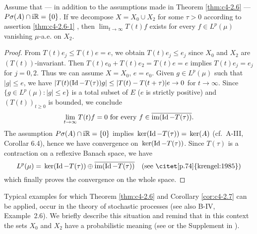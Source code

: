 \begin{corollary}\label{cor:c4-2.7}
%
%
%
Assume that --- in addition to the assumptions made in Theorem \ref{thm:c4-2.6} --- $P{\sigma}(A) \cap \mathrm{i}\mathbb{R} = \{0\}$.
If we decompose $X = X_{0} \cup X_{2}$ for some $\tau > 0$ according to assertion \ref{thm:c4-2.6-1} , then $\lim_{t \to \infty} T(t)f$ exists for every $f \in L^{p}(\mu)$ vanishing $\mu$-a.e. on $X_{2}$.
\end{corollary}
\begin{proof}
From $T(t)e_{j} \leq T(t)e = e$, we obtain $T(t)e_{j} \leq e_{j}$ since $X_{0}$ and $X_{2}$ are $(T(t))$-invariant.
Then $T(t)e_{0} + T(t)e_{2} = T(t)e = e$ implies $T(t)e_{j} = e_{j}$ for $j=0,2$.
Thus we can assume $X = X_{0}$, $e = e_{0}$.
Given $g \in L^{p}(\mu)$ such that $|g| \leq e$, we have
$|T(t)(\operatorname{Id} - T(\tau))g| \leq |T(t) - T(t+\tau)|e \to 0$ for $t \to \infty$.
Since $\{g \in L^{p}(\mu) \colon |g| \leq e\}$ is a total subset of $E$ ($e$ is strictly positive) and $(T(t))_{t \geq 0}$ is bounded, we conclude
\begin{equation}\label{eq:c4-2.6}
\lim_{t \to \infty} T(t)f = 0 \text{ for every } f \in \overline{\text{im}(\operatorname{Id} - T(\tau))}.
\end{equation}
The assumption $P{\sigma}(A) \cap \mathrm{i}\mathbb{R} = \{0\}$ implies $\mathop{}\mathrm{ker}(\operatorname{Id} - T(\tau)) = \mathop{}\mathrm{ker}(A)$ (cf.\ A-III, Corollar 6.4), hence we have convergence on $\mathop{}\mathrm{ker}(\operatorname{Id} -T(\tau))$.
Since $T(\tau)$ is a contraction on a reflexive Banach space, we have
\[
L^{p}(\mu) = \Kern{\Id - T(\tau)} \oplus \overline{\text{im}(\Id - T(\tau))} \quad \text{(see \citet [p.74]{krengel:1985})}
\]  
which finally proves the convergence on the whole space.
\end{proof}
Typical examples for which Theorem \ref{thm:c4-2.6} and Corollary \ref{cor:c4-2.7}  can be applied, occur in the theory of stochastic processes (see also B-IV, Example~2.6).
We briefly describe this situation and remind that in this context the sets $X_{0}$ and $X_{2}$ have a probabilistic meaning (see \citet{greinernagel:1982} or the Supplement in \citet{krengel:1985}).


